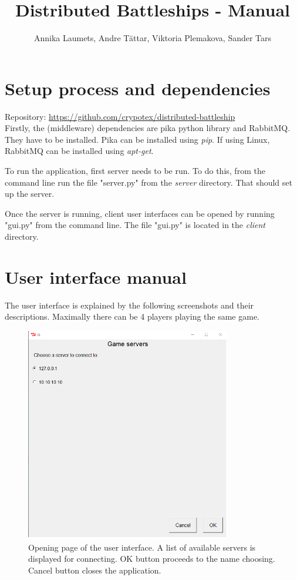 \documentclass[]{article}
\title{Distributed Battleships - Manual}
\author{Annika Laumets, Andre Tättar, Viktoria Plemakova, Sander Tars}
\begin{document}
\lstset{language=Python}  

\maketitle

\section*{Setup process and dependencies}

Repository: \url{https://github.com/crypotex/distributed-battleship}\\

Firstly, the (middleware) dependencies are pika python library and RabbitMQ. They have to be installed. Pika can be installed using \textit{pip}. If using Linux, RabbitMQ can be installed using \textit{apt-get}.

\noindent To run the application, first server needs to be run. To do this, from the command line run the file "server.py" from the \textit{server} directory. That should set up the server.

\noindent Once the server is running, client user interfaces can be opened by running "gui.py" from the command line. The file "gui.py" is located in the \textit{client} directory. 
\newpage

\section*{User interface manual}
The user interface is explained by the following screenshots and their descriptions. Maximally there can be 4 players playing the same game.


\begin{figure}[!hbt]
	\centering
	\includegraphics[width=0.8\textwidth]{OpenPage.png}
	\caption{Opening page of the user interface. A list of available servers is displayed for connecting. OK button proceeds to the name choosing. Cancel button closes the application.}
	\label{fig:Openpage}
\end{figure}
\end{document}
